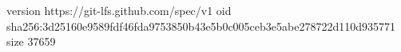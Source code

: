 version https://git-lfs.github.com/spec/v1
oid sha256:3d25160e9589fdf46fda9753850b43e5b0c005ceb3e5abe278722d110d935771
size 37659
